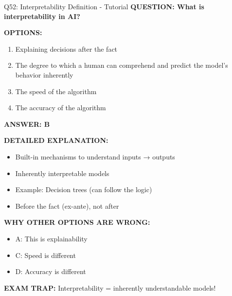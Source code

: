 \documentclass[8pt]{beamer}
\begin{document}
	\begin{frame}{Q52: Interpretability Definition - Tutorial}
		\fontsize{6.5}{7.5}\selectfont
		\textbf{QUESTION: What is interpretability in AI?}
		
		\vspace{0.1cm}
		\textbf{OPTIONS:}
		\begin{enumerate}
			\item Explaining decisions after the fact
			\item The degree to which a human can comprehend and predict the model's behavior inherently
			\item The speed of the algorithm
			\item The accuracy of the algorithm
		\end{enumerate}
		
		\vspace{0.1cm}
		\textcolor{myblue}{\textbf{ANSWER: B}}
		
		\vspace{0.1cm}
		\textbf{DETAILED EXPLANATION:}
		\begin{itemize}
			\item Built-in mechanisms to understand inputs → outputs
			\item Inherently interpretable models
			\item Example: Decision trees (can follow the logic)
			\item Before the fact (ex-ante), not after
		\end{itemize}
		
		\vspace{0.1cm}
		\textcolor{myred}{\textbf{WHY OTHER OPTIONS ARE WRONG:}}
		\begin{itemize}
			\item \textcolor{myred}{A:} This is explainability
			\item \textcolor{myred}{C:} Speed is different
			\item \textcolor{myred}{D:} Accuracy is different
		\end{itemize}
		
		\textcolor{myred}{\textbf{EXAM TRAP:}} Interpretability = \textcolor{myblue}{inherently understandable models}!
	\end{frame}
	
\end{document}
